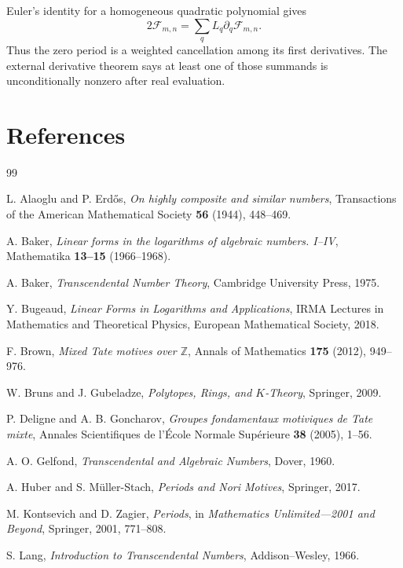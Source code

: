 \documentclass[11pt,oneside]{article}
\theoremstyle{definition}
\begin{document}
Euler's identity for a homogeneous quadratic polynomial gives
\[
  2\mathcal F_{m,n}=\sum_q L_q\partial_q\mathcal F_{m,n}.
\]
Thus the zero period is a weighted cancellation among its first derivatives.  The external derivative theorem says at least one of those summands is unconditionally nonzero after real evaluation.

\section{References}

\begin{thebibliography}{99}

L. Alaoglu and P. Erd\H{o}s,
\emph{On highly composite and similar numbers},
Transactions of the American Mathematical Society \textbf{56} (1944), 448--469.

A. Baker,
\emph{Linear forms in the logarithms of algebraic numbers. I--IV},
Mathematika \textbf{13--15} (1966--1968).

A. Baker,
\emph{Transcendental Number Theory},
Cambridge University Press, 1975.

Y. Bugeaud,
\emph{Linear Forms in Logarithms and Applications},
IRMA Lectures in Mathematics and Theoretical Physics, European Mathematical Society, 2018.

F. Brown,
\emph{Mixed Tate motives over $\mathbb Z$},
Annals of Mathematics \textbf{175} (2012), 949--976.

W. Bruns and J. Gubeladze,
\emph{Polytopes, Rings, and $K$-Theory},
Springer, 2009.

P. Deligne and A. B. Goncharov,
\emph{Groupes fondamentaux motiviques de Tate mixte},
Annales Scientifiques de l'\'Ecole Normale Sup\'erieure \textbf{38} (2005), 1--56.

A. O. Gelfond,
\emph{Transcendental and Algebraic Numbers},
Dover, 1960.

A. Huber and S. M\"uller-Stach,
\emph{Periods and Nori Motives},
Springer, 2017.

M. Kontsevich and D. Zagier,
\emph{Periods},
in \emph{Mathematics Unlimited---2001 and Beyond}, Springer, 2001, 771--808.

S. Lang,
\emph{Introduction to Transcendental Numbers},
Addison--Wesley, 1966.


\end{thebibliography}
\end{document}
